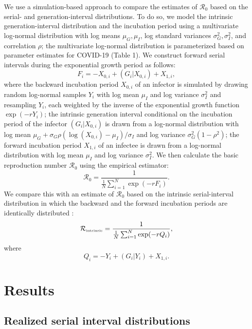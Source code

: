 \documentclass[12pt]{article}
\newcommand{\Rx}[1]{\ensuremath{{\mathcal R}_{#1}}\xspace}
\newcommand{\Ro}{\Rx{0}}
\newcommand{\Rintrinsic}{\ensuremath{{\mathcal R}_{\textrm{\tiny intrinsic}}}\xspace}
\begin{document}
We use a simulation-based approach to compare the estimates of \Ro based on the serial- and generation-interval distributions. 
To do so, we model the intrinsic generation-interval distribution and the incubation period using a multivariate log-normal distribution with log means $\mu_G, \mu_I$, log standard variances $\sigma_G^2, \sigma_I^2$, and correlation $\rho$;
the multivariate log-normal distribution is parameterized based on parameter estimates for COVID-19 (Table 1).
We construct forward serial intervals during the exponential growth period as follows:
\begin{equation}
F_i = -X_{0,i} + (G_i|X_{0,i}) + X_{1,i},
\end{equation}
where the backward incubation period $X_{0,i}$ of an infector is simulated by drawing random log-normal samples $Y_i$ with log mean $\mu_I$ and log variance $\sigma_I^2$ and resampling $Y_i$, each weighted by the inverse of the exponential growth function $\exp(-rY_i)$;
the intrinsic generation interval conditional on the incubation period of the infector $(G_i|X_{0,i})$ is drawn from a log-normal distribution with log mean $\mu_G + \sigma_G \rho (\log(X_{0,i}) - \mu_I)/\sigma_I$ and log variance $\sigma_G^2 (1-\rho^2)$;
the forward incubation period $X_{1,i}$ of an infectee is drawn from a log-normal distribution with log mean $\mu_I$ and log variance $\sigma_I^2$.
We then calculate the basic reproduction number \Ro using the empirical estimator:
\begin{equation}
\Ro = \frac{1}{\frac{1}{N}\sum_{i=1}^N \exp(- r F_i)}.
\end{equation}
We compare this with an estimate of \Ro based on the intrinsic serial-interval distribution in which the backward and the forward incubation periods are identically distributed \citep{svensson2007note,klinkenberg2011correlation,champredon2018equivalence, britton2019estimation}:
\begin{equation}
  \Rintrinsic = \frac{1}{\frac{1}{N}\sum_{i=1}^N \exp(- r Q_i)},
\end{equation}
where
\begin{equation}
Q_i = -Y_i + (G_i|Y_i) + X_{1,i}.
\end{equation}

\section{Results}

\subsection{Realized serial interval distributions}
\end{document}
